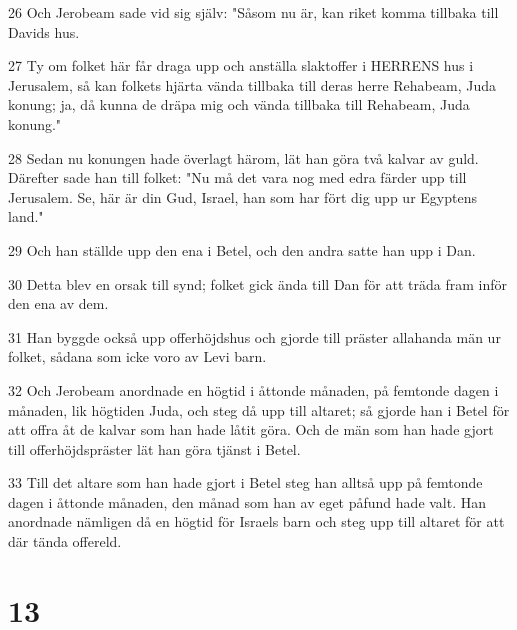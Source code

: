 \par 26 Och Jerobeam sade vid sig själv: "Såsom nu är, kan riket komma tillbaka till Davids hus.
\par 27 Ty om folket här får draga upp och anställa slaktoffer i HERRENS hus i Jerusalem, så kan folkets hjärta vända tillbaka till deras herre Rehabeam, Juda konung; ja, då kunna de dräpa mig och vända tillbaka till Rehabeam, Juda konung."
\par 28 Sedan nu konungen hade överlagt härom, lät han göra två kalvar av guld. Därefter sade han till folket: "Nu må det vara nog med edra färder upp till Jerusalem. Se, här är din Gud, Israel, han som har fört dig upp ur Egyptens land."
\par 29 Och han ställde upp den ena i Betel, och den andra satte han upp i Dan.
\par 30 Detta blev en orsak till synd; folket gick ända till Dan för att träda fram inför den ena av dem.
\par 31 Han byggde också upp offerhöjdshus och gjorde till präster allahanda män ur folket, sådana som icke voro av Levi barn.
\par 32 Och Jerobeam anordnade en högtid i åttonde månaden, på femtonde dagen i månaden, lik högtiden Juda, och steg då upp till altaret; så gjorde han i Betel för att offra åt de kalvar som han hade låtit göra. Och de män som han hade gjort till offerhöjdspräster lät han göra tjänst i Betel.
\par 33 Till det altare som han hade gjort i Betel steg han alltså upp på femtonde dagen i åttonde månaden, den månad som han av eget påfund hade valt. Han anordnade nämligen då en högtid för Israels barn och steg upp till altaret för att där tända offereld.

\chapter{13}

